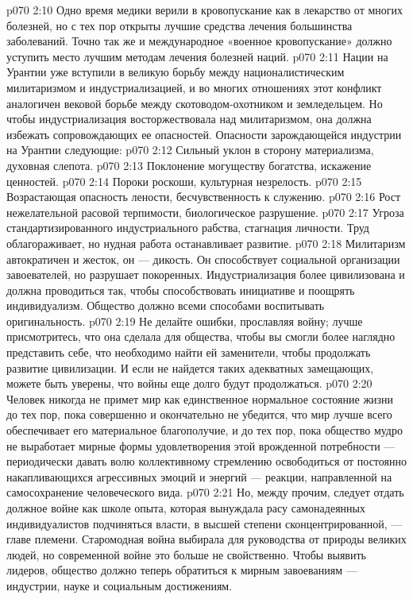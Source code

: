 \vs p070 2:10 Одно время медики верили в кровопускание как в лекарство от многих болезней, но с тех пор открыты лучшие средства лечения большинства заболеваний. Точно так же и международное «военное кровопускание» должно уступить место лучшим методам лечения болезней наций.
\vs p070 2:11 Нации на Урантии уже вступили в великую борьбу между националистическим милитаризмом и индустриализацией, и во многих отношениях этот конфликт аналогичен вековой борьбе между скотоводом\hyp{}охотником и земледельцем. Но чтобы индустриализация восторжествовала над милитаризмом, она должна избежать сопровождающих ее опасностей. Опасности зарождающейся индустрии на Урантии следующие:
\vs p070 2:12 \bibnobreakspace Сильный уклон в сторону материализма, духовная слепота.
\vs p070 2:13 \bibnobreakspace Поклонение могуществу богатства, искажение ценностей.
\vs p070 2:14 \bibnobreakspace Пороки роскоши, культурная незрелость.
\vs p070 2:15 \bibnobreakspace Возрастающая опасность лености, бесчувственность к служению.
\vs p070 2:16 \bibnobreakspace Рост нежелательной расовой терпимости, биологическое разрушение.
\vs p070 2:17 \bibnobreakspace Угроза стандартизированного индустриального рабства, стагнация личности. Труд облагораживает, но нудная работа останавливает развитие.
\vs p070 2:18 \pc Милитаризм автократичен и жесток, он --- дикость. Он способствует социальной организации завоевателей, но разрушает покоренных. Индустриализация более цивилизована и должна проводиться так, чтобы способствовать инициативе и поощрять индивидуализм. Общество должно всеми способами воспитывать оригинальность.
\vs p070 2:19 Не делайте ошибки, прославляя войну; лучше присмотритесь, что она сделала для общества, чтобы вы смогли более наглядно представить себе, что необходимо найти ей заменители, чтобы продолжать развитие цивилизации. И если не найдется таких адекватных замещающих, можете быть уверены, что войны еще долго будут продолжаться.
\vs p070 2:20 Человек никогда не примет мир как единственное нормальное состояние жизни до тех пор, пока совершенно и окончательно не убедится, что мир лучше всего обеспечивает его материальное благополучие, и до тех пор, пока общество мудро не выработает мирные формы удовлетворения этой врожденной потребности --- периодически давать волю коллективному стремлению освободиться от постоянно накапливающихся агрессивных эмоций и энергий --- реакции, направленной на самосохранение человеческого вида.
\vs p070 2:21 Но, между прочим, следует отдать должное войне как школе опыта, которая вынуждала расу самонадеянных индивидуалистов подчиняться власти, в высшей степени сконцентрированной, --- главе племени. Старомодная война выбирала для руководства от природы великих людей, но современной войне это больше не свойственно. Чтобы выявить лидеров, общество должно теперь обратиться к мирным завоеваниям --- индустрии, науке и социальным достижениям.
